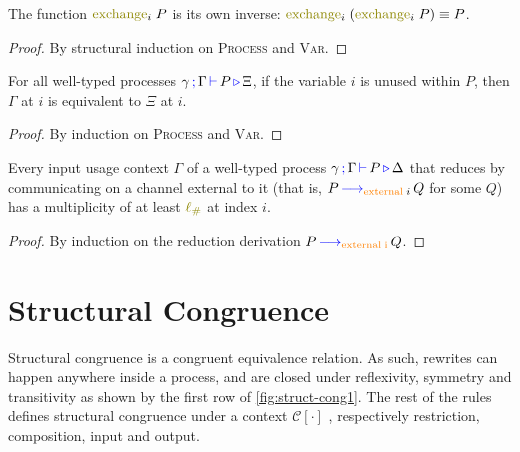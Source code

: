 \begin{nilemma}
  \label{lm:exchange-exchange}
  The function $\func{exchange}_i \; P$ is its own inverse: $\func{exchange}_i \; (\func{exchange}_i \; P) \equiv P$.
\end{nilemma}
\begin{proof}
  By structural induction on \textsc{Process} and \textsc{Var}.
\end{proof}

\begin{nilemma}
  \label{lm:types-unused}
  For all well-typed processes $\gamma \, \textcolor{blue}{\operatorname{;}} \, \Gamma \, \textcolor{blue}{\operatorname{\vdash}} \, P \, \textcolor{blue}{\operatorname{\triangleright}} \, \Xi$, if the variable $i$ is unused within $P$, then $\Gamma$ at $i$ is equivalent to $\Xi$ at $i$.
\end{nilemma}
\begin{proof}
  By induction on \textsc{Process} and \textsc{Var}.
\end{proof}

\begin{nilemma}
  \label{lm:comm-capable}
  Every input usage context $\Gamma$ of a well-typed process $\gamma \, \textcolor{blue}{\operatorname{;}} \, \Gamma \, \textcolor{blue}{\operatorname{\vdash}} \, P \, \textcolor{blue}{\operatorname{\triangleright}} \, \Delta$ that reduces by communicating on a channel external to it (that is, $P \, \textcolor{blue}{\operatorname{\longrightarrow}}_{\textcolor{orange}{\operatorname{external}} \; i} \, Q$ for some $Q$) has a multiplicity of at least $\lio$ at index $i$.
\end{nilemma}

\begin{proof}
  By induction on the reduction derivation $P \, \textcolor{blue}{\operatorname{\longrightarrow}}_{\textcolor{orange}{\operatorname{external \; i}}} \,Q$.
\end{proof}

\section{Structural Congruence}
\label{app:struct}

Structural congruence is a congruent equivalence relation.
As such, rewrites can happen anywhere inside a process, and are closed under reflexivity, symmetry and transitivity as shown by the first row of \autoref{fig:struct-cong1}.
The rest of the rules defines structural congruence under a context $\mathcal{C}[\cdot]$ \cite{Sangio01}, respectively restriction, composition, input and output.

